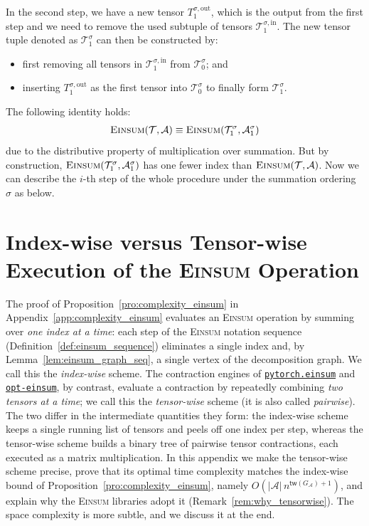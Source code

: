 \documentclass[sn-mathphys, natbib=false]{sn-jnl}
\newcommand{\libref}[2]{\href{#2}{\texttt{#1}}}
\theoremstyle{plain}
\theoremstyle{definition}
\def\Einsum{\textsc{Einsum}}
\newcommand{\tensorcontraction}{\textsc{Einsum}}
\newcommand{\treewidthp}[1]{\mathsf{tw}(#1)}
\newcommand{\less}{O}
\newif\ifshowchanges
\newcommand{\rev}[1]{%
  \ifshowchanges
    {\color{red} #1}%
  \else
    #1%
  \fi
}
\newcommand{\torcheinsum}{\libref{pytorch.einsum}{https://pytorch.org/docs/stable/generated/torch.einsum.html}}
\newcommand{\opteinsum}{\libref{opt-einsum}{https://dgasmith.github.io/opt_einsum/}}
\def\calA{\mathcal{A}}
\def\calT{\mathcal{T}}
\begin{document}
\begin{bibunit}[agsm]
    In the second step, we have a new tensor $T^{\sigma,\mathrm{out}}_{1}$, which is the output from the first step and we need to remove the used subtuple of tensors $\calT^{\sigma, \mathrm{in}}_{1}$. The new tensor tuple denoted as $\calT^{\sigma}_{1}$ can then be constructed by:
    \begin{itemize}
    \item first removing all tensors in $\calT^{\sigma, \mathrm{in}}_1$ from $\calT_{0}^{\sigma}$; and
    \item inserting $T^{\sigma,\mathrm{out}}_1$ as the first tensor into $\calT_{0}^{\sigma}$ to finally form $\calT^{\sigma}_{1}$.
    \end{itemize}
    The following identity holds:
    \begin{align*}
    \tensorcontraction(\calT, \calA) \equiv \tensorcontraction(\calT^\sigma_1, \calA^\sigma_1) 
    \end{align*}
    due to the distributive property of multiplication over summation. But by construction, $\tensorcontraction(\calT^\sigma_1, \calA^\sigma_1)$ has one fewer index than $\tensorcontraction(\calT, \calA)$. 
    Now we can describe the $i$-th step of the whole procedure under the summation ordering $\sigma$ as below.
\fi


\section{Index-wise versus Tensor-wise Execution of the \Einsum{} Operation}
\label{app:index_tensor}

\rev{The proof of Proposition~\ref{pro:complexity_einsum} in Appendix~\ref{app:complexity_einsum} evaluates an \Einsum{} operation by summing over \emph{one index at a time}: each step of the \Einsum{} notation sequence (Definition~\ref{def:einsum_sequence}) eliminates a single index and, by Lemma~\ref{lem:einsum_graph_seq}, a single vertex of the decomposition graph. We call this the \emph{index-wise} scheme. The contraction engines of \torcheinsum{} and \opteinsum{}, by contrast, evaluate a contraction by repeatedly combining \emph{two tensors at a time}; we call this the \emph{tensor-wise} scheme (it is also called \emph{pairwise}). The two differ in the intermediate quantities they form: the index-wise scheme keeps a single running list of tensors and peels off one index per step, whereas the tensor-wise scheme builds a binary tree of pairwise tensor contractions, each executed as a matrix multiplication. In this appendix we make the tensor-wise scheme precise, prove that its optimal time complexity matches the index-wise bound of Proposition~\ref{pro:complexity_einsum}, namely $\less(|\calA|\, n^{\treewidthp{G_\calA}+1})$, and explain why the \Einsum{} libraries adopt it (Remark~\ref{rem:why_tensorwise}). The space complexity is more subtle, and we discuss it at the end.}


\end{bibunit}
\end{document}
